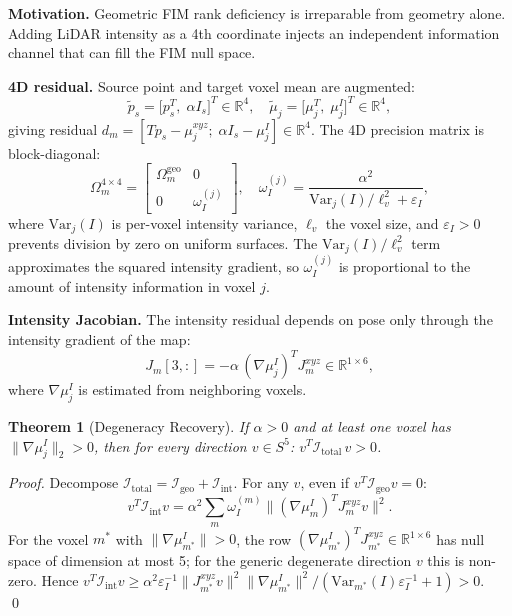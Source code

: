 \documentclass[letterpaper, 10pt, conference]{ieeeconf}
\newtheorem{theorem}{Theorem}
\newcommand{\FIM}{\mathcal{I}}
\begin{document}
\textbf{Motivation.}
Geometric FIM rank deficiency is irreparable from geometry alone.
Adding LiDAR intensity as a 4th coordinate injects an independent information
channel that can fill the FIM null space.

\textbf{4D residual.}
Source point and target voxel mean are augmented:
\begin{equation}
  \tilde{p}_s = \bigl[p_s^T,\; \alpha I_s\bigr]^T \in \mathbb{R}^4, \quad
  \tilde{\mu}_j = \bigl[\mu_j^T,\; \mu_j^I\bigr]^T \in \mathbb{R}^4,
  \label{eq:4d_aug}
\end{equation}
giving residual $d_m = [Tp_s - \mu_j^{xyz};\; \alpha I_s - \mu_j^I] \in \mathbb{R}^4$.
The 4D precision matrix is block-diagonal:
\begin{equation}
  \Omega_m^{4\times4} =
  \begin{bmatrix} \Omega_m^{\mathrm{geo}} & 0 \\ 0 & \omega_I^{(j)} \end{bmatrix},
  \quad
  \omega_I^{(j)} = \frac{\alpha^2}{\mathrm{Var}_j(I) / \ell_v^2 + \varepsilon_I},
  \label{eq:4d_omega}
\end{equation}
where $\mathrm{Var}_j(I)$ is per-voxel intensity variance, $\ell_v$ the voxel size,
and $\varepsilon_I > 0$ prevents division by zero on uniform surfaces.
The $\mathrm{Var}_j(I)/\ell_v^2$ term approximates the squared intensity gradient,
so $\omega_I^{(j)}$ is proportional to the amount of intensity information in voxel $j$.

\textbf{Intensity Jacobian.}
The intensity residual depends on pose only through the intensity gradient of the map:
\begin{equation}
  J_m[3,:] = -\alpha\,(\nabla\mu_j^I)^T J_m^{xyz} \in \mathbb{R}^{1\times6},
  \label{eq:intensity_jac}
\end{equation}
where $\nabla\mu_j^I$ is estimated from neighboring voxels.

\begin{theorem}[Degeneracy Recovery]\label{thm:degeneracy}
If $\alpha > 0$ and at least one voxel has $\|\nabla\mu_j^I\|_2 > 0$, then
for every direction $v \in S^5$:
$v^T \FIM_{\mathrm{total}}\, v > 0$.
\end{theorem}
\begin{proof}
Decompose $\FIM_{\mathrm{total}} = \FIM_{\mathrm{geo}} + \FIM_{\mathrm{int}}$.
For any $v$, even if $v^T\FIM_{\mathrm{geo}} v = 0$:
\begin{equation*}
  v^T\FIM_{\mathrm{int}} v
  = \alpha^2\sum_m \omega_I^{(m)} \bigl\|(\nabla\mu_m^I)^T J_m^{xyz} v\bigr\|^2.
\end{equation*}
For the voxel $m^*$ with $\|\nabla\mu_{m^*}^I\| > 0$, the row
$(\nabla\mu_{m^*}^I)^T J_{m^*}^{xyz} \in \mathbb{R}^{1\times6}$ has null space
of dimension at most 5; for the generic degenerate direction $v$ this is non-zero.
Hence $v^T\FIM_{\mathrm{int}} v \geq \alpha^2\varepsilon_I^{-1}\|J_{m^*}^{xyz} v\|^2
\|\nabla\mu_{m^*}^I\|^2 / (\mathrm{Var}_{m^*}(I)\varepsilon_I^{-1}+1) > 0$. \qed
\end{proof}
\end{document}
